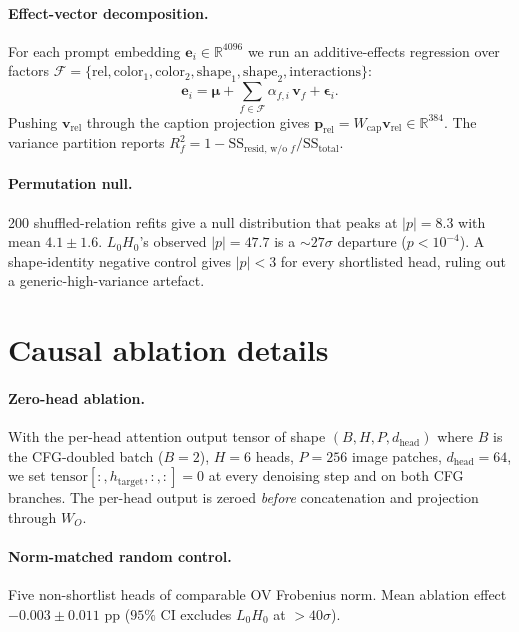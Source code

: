 \documentclass{article}
\begin{document}
\paragraph{Effect-vector decomposition.} For each prompt embedding $\mathbf{e}_i\in\mathbb{R}^{4096}$ we run an additive-effects regression over factors $\mathcal{F}\!=\!\{\text{rel},\text{color}_1,\text{color}_2,\text{shape}_1,\text{shape}_2,\text{interactions}\}$:
\begin{equation}
\mathbf{e}_i = \boldsymbol{\mu} + \sum_{f\in\mathcal{F}} \alpha_{f,i}\,\mathbf{v}_f + \boldsymbol{\epsilon}_i.
\end{equation}
Pushing $\mathbf{v}_\text{rel}$ through the caption projection gives $\mathbf{p}_\text{rel} = W_\text{cap}\mathbf{v}_\text{rel} \in \mathbb{R}^{384}$. The variance partition reports $R^2_f = 1 - \mathrm{SS}_\text{resid, w/o $f$}/\mathrm{SS}_\text{total}$.

\paragraph{Permutation null.} 200 shuffled-relation refits give a null distribution that peaks at $|p|\!=\!8.3$ with mean $4.1\pm 1.6$. $L_0H_0$'s observed $|p|\!=\!47.7$ is a $\sim\!27\sigma$ departure ($p\!<\!10^{-4}$). A shape-identity negative control gives $|p|\!<\!3$ for every shortlisted head, ruling out a generic-high-variance artefact.

\section{Causal ablation details}
\label{app:ablation}

\paragraph{Zero-head ablation.} With the per-head attention output tensor of shape $(B, H, P, d_\text{head})$ where $B$ is the CFG-doubled batch ($B{=}2$), $H{=}6$ heads, $P{=}256$ image patches, $d_\text{head}{=}64$, we set $\text{tensor}[:, h_\text{target}, :, :] = 0$ at every denoising step and on both CFG branches. The per-head output is zeroed \emph{before} concatenation and projection through $W_O$.

\paragraph{Norm-matched random control.} Five non-shortlist heads of comparable OV Frobenius norm. Mean ablation effect $-0.003 \pm 0.011$ pp ($95\%$ CI excludes $L_0H_0$ at $> 40\sigma$).
\end{document}
